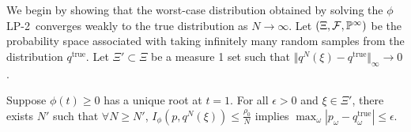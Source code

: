 \documentclass[opre,nonblindrev]{informs3} %
\renewcommand{\P}{\mathbb{P}}
\newcommand{\qtrue}{q^{\text{true}}}
\newcommand{\plp}{$\phi$LP-2}
\begin{document}
We begin by showing that the worst-case distribution obtained by solving the \plp\ converges weakly to the true distribution as $N \rightarrow \infty$.
Let $(\Xi,{\cal F},\P^\infty)$ be the probability space associated with taking infinitely many random samples from the distribution $\qtrue$.
Let $\Xi' \subset \Xi$ be a measure 1 set such that $\Vert q^N(\xi) - \qtrue \Vert_\infty \rightarrow 0$.

\begin{proposition} \label{prop:weak_conv}
	Suppose $\phi(t) \geq 0$ has a unique root at $t = 1$.
	For all $\epsilon > 0$ and $\xi \in \Xi'$, there exists $N'$ such that $\forall N \geq N'$, $I_{\phi}(p,q^N(\xi)) \leq \frac{\rho_0}{N}$ implies $\max_\omega |p_\omega - \qtrue_\omega| \leq \epsilon$.
\end{proposition}
\end{document}
